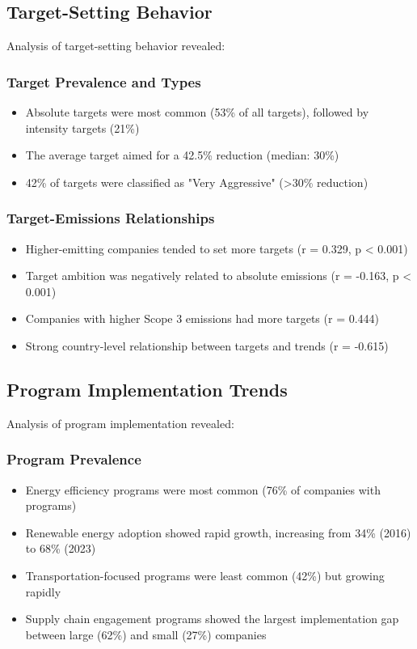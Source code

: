 \documentclass[11pt,a4paper]{article}
\begin{document}
\subsection{Target-Setting Behavior}
Analysis of target-setting behavior revealed:

\subsubsection{Target Prevalence and Types}
\begin{itemize}
    \item Absolute targets were most common (53\% of all targets), followed by intensity targets (21\%)
    \item The average target aimed for a 42.5\% reduction (median: 30\%)
    \item 42\% of targets were classified as "Very Aggressive" (>30\% reduction)
\end{itemize}

\subsubsection{Target-Emissions Relationships}
\begin{itemize}
    \item Higher-emitting companies tended to set more targets (r = 0.329, p < 0.001)
    \item Target ambition was negatively related to absolute emissions (r = -0.163, p < 0.001)
    \item Companies with higher Scope 3 emissions had more targets (r = 0.444)
    \item Strong country-level relationship between targets and trends (r = -0.615)
\end{itemize}

\subsection{Program Implementation Trends}
Analysis of program implementation revealed:

\subsubsection{Program Prevalence}
\begin{itemize}
    \item Energy efficiency programs were most common (76\% of companies with programs)
    \item Renewable energy adoption showed rapid growth, increasing from 34\% (2016) to 68\% (2023)
    \item Transportation-focused programs were least common (42\%) but growing rapidly
    \item Supply chain engagement programs showed the largest implementation gap between large (62\%) and small (27\%) companies
\end{itemize}
\end{document}
